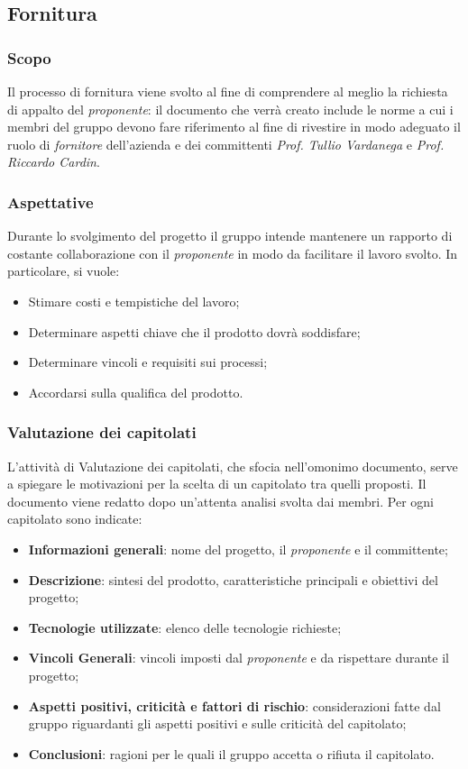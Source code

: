 \subsection{Fornitura}
\subsubsection{Scopo}
Il processo di fornitura viene svolto al fine di comprendere al meglio la richiesta di appalto del \emph{proponente}: il documento che verrà creato include le norme a cui i membri del gruppo \teamname{} devono fare riferimento al fine di rivestire in modo adeguato il ruolo di \emph{fornitore} dell'azienda \proponente{} e dei committenti \textit{Prof. Tullio Vardanega} e \textit{Prof. Riccardo Cardin}.
\subsubsection{Aspettative}
Durante lo svolgimento del progetto il gruppo intende mantenere un rapporto di costante collaborazione con il \emph{proponente} in modo da facilitare il lavoro svolto.
In particolare, si vuole:
\begin{itemize}
	\item Stimare costi e tempistiche del lavoro;
	\item Determinare aspetti chiave che il prodotto dovrà soddisfare;
	\item Determinare vincoli e requisiti sui processi;
	\item Accordarsi sulla qualifica del prodotto.
\end{itemize}

\subsubsection{Valutazione dei capitolati}
L'attività di Valutazione dei capitolati, che sfocia nell'omonimo documento, serve a spiegare le motivazioni per la scelta di un capitolato tra quelli proposti.
Il documento \VdC{} viene redatto dopo un'attenta analisi svolta dai membri.
Per ogni capitolato sono indicate:
\begin{itemize}
	\item \textbf{Informazioni generali}: nome del progetto, il \emph{proponente} e il committente;
	\item \textbf{Descrizione}: sintesi del prodotto, caratteristiche principali e obiettivi del progetto;
	\item \textbf{Tecnologie utilizzate}: elenco delle tecnologie richieste;
	\item \textbf{Vincoli Generali}: vincoli imposti dal \emph{proponente} e da rispettare durante il progetto;
	\item \textbf{Aspetti positivi, criticità e fattori di rischio}: considerazioni fatte dal gruppo riguardanti gli aspetti positivi e sulle criticità del capitolato;
	\item \textbf{Conclusioni}: ragioni per le quali il gruppo accetta o rifiuta il capitolato.
\end{itemize}


